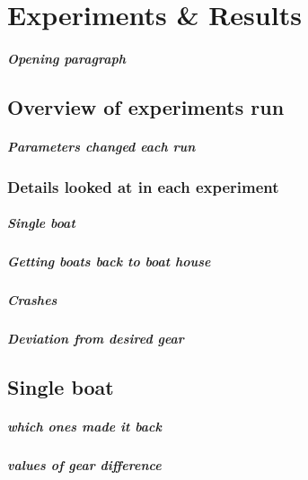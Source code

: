 \chapter{Experiments \& Results}
\paragraph{Opening paragraph}

\section{Overview of experiments run}
  
  \paragraph{Parameters changed each run}
  
  \subsection{Details looked at in each experiment}
    \paragraph{Single boat}
  
    \paragraph{Getting boats back to boat house}
    
    \paragraph{Crashes}
    
    \paragraph{Deviation from desired gear}

\section{Single boat}
  \paragraph{which ones made it back}
  \paragraph{values of gear difference}
    
